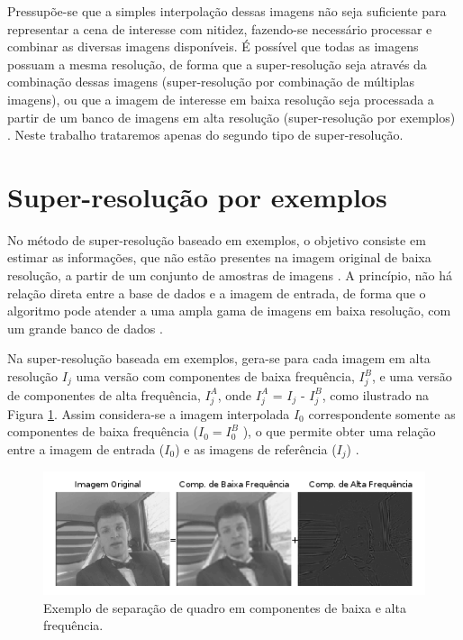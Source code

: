     Pressupõe-se que a simples interpolação dessas imagens não seja suficiente para representar a cena de interesse com nitidez, fazendo-se necessário processar e combinar as diversas imagens disponíveis. É possível que todas as imagens possuam a mesma resolução, de forma que a super-resolução seja através da combinação dessas imagens (super-resolução por combinação de múltiplas imagens), ou que a imagem de interesse em baixa resolução seja processada a partir de um banco de imagens em alta resolução (super-resolução por exemplos) \cite{garcia2013tecnicas}. Neste trabalho trataremos apenas do segundo tipo de super-resolução.


\section{Super-resolução por exemplos}
\label{SR_exemp}
No método de super-resolução baseado em exemplos, o objetivo consiste em estimar as informações, que não estão presentes na imagem original de baixa resolução, a partir de um conjunto de amostras de imagens \cite{rezio2013superresoluccao}. A princípio, não há relação direta entre a base de dados e a imagem de entrada, de forma que o algoritmo pode atender a uma ampla gama de imagens em baixa resolução, com um grande banco de dados \cite{freeman2002example}.


Na super-resolução baseada em exemplos, gera-se para cada imagem em alta resolução $I_j$ uma versão com componentes de baixa frequência, $I_j^B$, e uma versão de componentes de alta frequência, $I_j^A$, onde $I_j^A$ = $I_j$ - $I_j^B$, como ilustrado na Figura \ref{fig:exemplo_comp}. Assim considera-se a imagem interpolada $I_0$ correspondente somente as componentes de baixa frequência ($I_0 = I_0^B$ ), o que permite obter uma relação entre a imagem de entrada ($I_0$) e as imagens de referência ($I_j$) \cite{garcia2013tecnicas}.


\begin{figure}[h]
	\centering
	\includegraphics[scale=1]{figuras/exemplo_equacao.png}
	\caption{Exemplo de separação de quadro em componentes de baixa e alta frequência.}
	\label{fig:exemplo_comp}
\end{figure}


